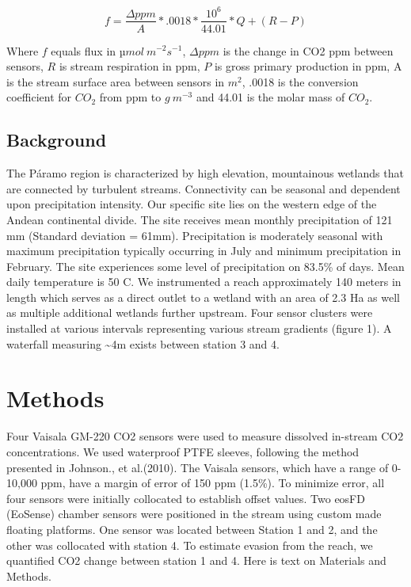 \documentclass[draft,linenumbers]{agujournal2018}
\begin{document}
\begin{linenomath*}
\begin{equation}
f=\frac{\Delta ppm}{A}*.0018*\frac{10^6}{44.01}*Q+(R-P)
\end{equation}
\end{linenomath*}

Where \(f\) equals flux in \(µmol\:m^{-2}s^{-1}\), \(\Delta ppm\) is the
change in CO2 ppm between sensors, \(R\) is stream respiration in ppm,
\(P\) is gross primary production in ppm, A is the stream surface area
between sensors in \(m^2\), .0018 is the conversion coefficient for
\(CO_2\) from ppm to \(g\:m^{-3}\) and 44.01 is the molar mass of
\(CO_2\).

\subsection{Background}

The Páramo region is characterized by high elevation, mountainous
wetlands that are connected by turbulent streams. Connectivity can be
seasonal and dependent upon precipitation intensity. Our specific site
lies on the western edge of the Andean continental divide. The site
receives mean monthly precipitation of 121 mm (Standard deviation =
61mm). Precipitation is moderately seasonal with maximum precipitation
typically occurring in July and minimum precipitation in February. The
site experiences some level of precipitation on 83.5\% of days. Mean
daily temperature is 50 C. We instrumented a reach approximately 140
meters in length which serves as a direct outlet to a wetland with an
area of 2.3 Ha as well as multiple additional wetlands further upstream.
Four sensor clusters were installed at various intervals representing
various stream gradients (figure 1). A waterfall measuring
\textasciitilde{}4m exists between station 3 and 4.

\section{Methods}

Four Vaisala GM-220 CO2 sensors were used to measure dissolved in-stream
CO2 concentrations. We used waterproof PTFE sleeves, following the
method presented in Johnson., et al.(2010). The Vaisala sensors, which
have a range of 0-10,000 ppm, have a margin of error of 150 ppm (1.5\%).
To minimize error, all four sensors were initially collocated to
establish offset values. Two eosFD (EoSense) chamber sensors were
positioned in the stream using custom made floating platforms. One
sensor was located between Station 1 and 2, and the other was collocated
with station 4. To estimate evasion from the reach, we quantified CO2
change between station 1 and 4. Here is text on Materials and Methods.
\end{document}
